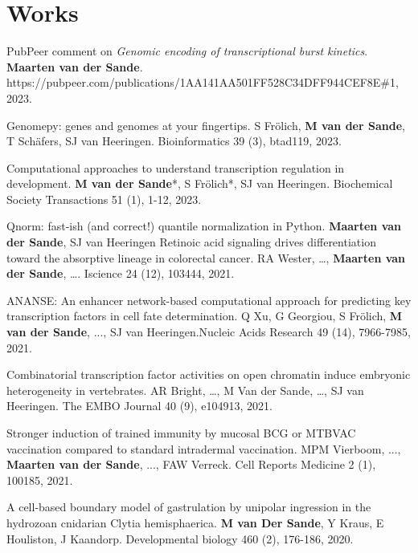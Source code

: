 \section{Works}

PubPeer comment on \textit{Genomic encoding of transcriptional burst kinetics}. \textbf{Maarten van der Sande}. https://pubpeer.com/publications/1AA141AA501FF528C34DFF944CEF8E\#1, 2023.

Genomepy: genes and genomes at your fingertips. S Frölich, \textbf{M van der Sande}, T Schäfers, SJ van Heeringen. Bioinformatics 39 (3), btad119, 2023.

Computational approaches to understand transcription regulation in development. \textbf{M van der Sande}*, S Frölich*, SJ van Heeringen. Biochemical Society Transactions 51 (1), 1-12, 2023.

Qnorm: fast-ish (and correct!) quantile normalization in Python. \textbf{Maarten van der Sande}, SJ van Heeringen
Retinoic acid signaling drives differentiation toward the absorptive lineage in colorectal cancer. RA Wester, \ldots, \textbf{Maarten van der Sande}, \ldots. Iscience 24 (12), 103444, 2021.

ANANSE: An enhancer network-based computational approach for predicting key transcription factors in cell fate determination. Q Xu, G Georgiou, S Frölich, \textbf{M van der Sande}, ..., SJ van Heeringen.Nucleic Acids Research 49 (14), 7966-7985, 2021.

Combinatorial transcription factor activities on open chromatin induce embryonic heterogeneity in vertebrates. AR Bright, \ldots, M Van der Sande, \ldots, SJ van Heeringen. The EMBO Journal 40 (9), e104913, 2021.

Stronger induction of trained immunity by mucosal BCG or MTBVAC vaccination compared to standard intradermal vaccination. MPM Vierboom, ..., \textbf{Maarten van der Sande}, ..., FAW Verreck. Cell Reports Medicine 2 (1), 100185, 2021.

A cell-based boundary model of gastrulation by unipolar ingression in the hydrozoan cnidarian Clytia hemisphaerica. \textbf{M van Der Sande}, Y Kraus, E Houliston, J Kaandorp. Developmental biology 460 (2), 176-186, 2020.

